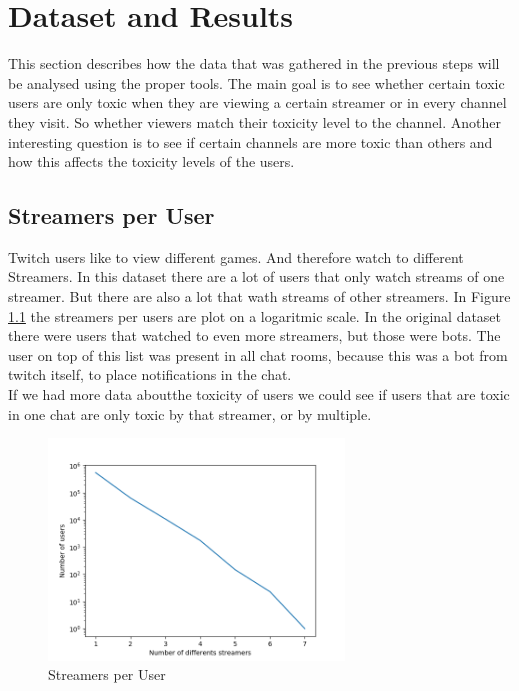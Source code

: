 \documentclass[final]{report}
\begin{document}
\chapter{Dataset and Results}
\label{ch:dataset}

This section describes how the data that was gathered in the previous steps will be analysed using the proper tools. The main goal is to see whether certain toxic users are only toxic when they are viewing a certain streamer or in every channel they visit. So whether viewers match their toxicity level to the channel. Another interesting question is to see if certain channels are more toxic than others and how this affects the toxicity levels of the users. 

\section{Streamers per User}
Twitch users like to view different games. And therefore watch to different Streamers. In this dataset there are a lot of users that only watch streams of one streamer. But there are also a lot that wath streams of other streamers. In Figure \ref{fig:streamPerUser} the streamers per users are plot on a logaritmic scale. In the original dataset there were users that watched to even more streamers, but those were bots. The user on top of this list was present in all chat rooms, because this was a bot from twitch itself, to place notifications in the chat.\\
If we had more data aboutthe toxicity of users we could see if users that are toxic in one chat are only toxic by that streamer, or by multiple. 

\begin{figure}[h]
	\centering
	\includegraphics[width=0.7\textwidth]{StreamersPerUser.png}
	\caption{Streamers per User}
	\label{fig:streamPerUser}
\end{figure}
\end{document}
